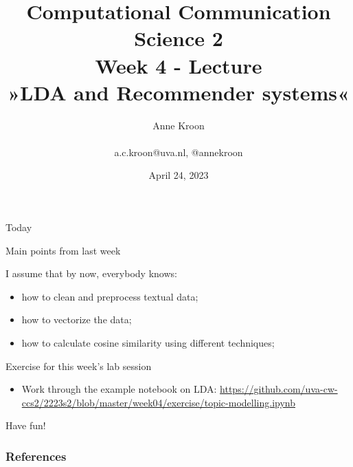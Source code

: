 \documentclass[handout]{beamer}
\title[Computational Communication Science 2]{\textbf{Computational Communication Science 2} \\Week 4 - Lecture\\ »LDA and Recommender systems«}
\author[Anne Kroon]{Anne Kroon \\ ~ \\ \footnotesize{ a.c.kroon@uva.nl, @annekroon} \\}
\date{April 24, 2023}
\institute[Digital Society Minor, University of Amsterdam]{Digital Society Minor, University of Amsterdam}
\begin{document}
	
	\begin{frame}{}
		\titlepage
	\end{frame}
	
	\begin{frame}{Today}
		\begin{tiny}
		\tableofcontents
		\end{tiny}
	\end{frame}



	\begin{frame}{Main points from last week}
		\begin{alertblock}{I assume that by now, everybody knows:}
			\begin{itemize}[<+>]
				\item how to clean and preprocess textual data;
				\item how to vectorize the data;
				\item how to calculate cosine similarity using different techniques;
			\end{itemize}
		\end{alertblock}
	\end{frame}



\begin{frame}[plain]
	
	\begin{block}{Exercise for this week's lab session}
		\footnotesize
		\begin{itemize}
			\item Work through the example notebook on LDA: \url{https://github.com/uva-cw-ccs2/2223s2/blob/master/week04/exercise/topic-modelling.ipynb}
			\end{itemize}
	\end{block}
\end{frame}



\begin{frame}[standout]
Have fun!
\end{frame}

\begin{frame}[t,allowframebreaks]
	\frametitle{References}
	\printbibliography
\end{frame}
\end{document}
